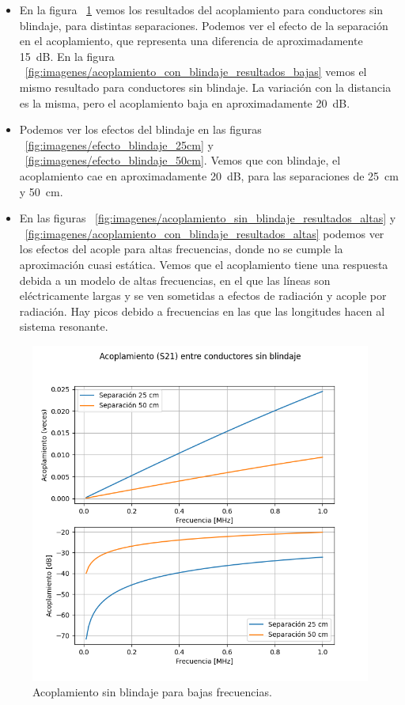 \begin{itemize}
  \item En la figura ~\ref{fig:imagenes/acoplamiento_sin_blindaje_resultados_bajas} vemos los resultados del acoplamiento para conductores sin blindaje, para distintas separaciones. Podemos ver el efecto de la separación en el acoplamiento, que representa una diferencia de aproximadamente \SI{15}{\dB}. En la figura ~\ref{fig:imagenes/acoplamiento_con_blindaje_resultados_bajas} vemos el mismo resultado para conductores sin blindaje. La variación con la distancia es la misma, pero el acoplamiento baja en aproximadamente \SI{20}{\dB}.
  \item Podemos ver los efectos del blindaje en las figuras ~\ref{fig:imagenes/efecto_blindaje_25cm} y ~\ref{fig:imagenes/efecto_blindaje_50cm}. Vemos que con blindaje, el acoplamiento cae en aproximadamente \SI{20}{\dB}, para las separaciones de \SI{25}{\cm} y \SI{50}{\cm}.
  \item En las figuras ~\ref{fig:imagenes/acoplamiento_sin_blindaje_resultados_altas} y ~\ref{fig:imagenes/acoplamiento_con_blindaje_resultados_altas} podemos ver los efectos del acople para altas frecuencias, donde no se cumple la aproximación cuasi estática. Vemos que el acoplamiento tiene una respuesta debida a un modelo de altas frecuencias, en el que las líneas son eléctricamente largas y se ven sometidas a efectos de radiación y acople por radiación. Hay picos debido a frecuencias en las que las longitudes hacen al sistema resonante.
\end{itemize}

\begin{figure}[ht]
  \centering
  \includegraphics[width=0.47\linewidth]{imagenes/acoplamiento_sin_blindaje_resultados_bajas.png}
  \caption{Acoplamiento sin blindaje para bajas frecuencias.}%
  \label{fig:imagenes/acoplamiento_sin_blindaje_resultados_bajas}
\end{figure}

